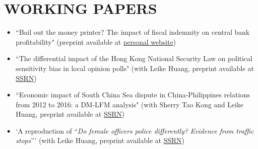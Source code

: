 \documentclass[a4paper,9pt]{extarticle}
\begin{document}
\section*{WORKING PAPERS}
\begin{itemize}
    \item ``Bail out the money printer? The impact of fiscal indemnity on central bank profitability" (preprint available at \href{https://rubuky.com/papers/bailoutcb/}{personal website})
    \item ``The differential impact of the Hong Kong National Security Law on political sensitivity bias in local opinion polls" (with Leike Huang, preprint available at \href{https://dx.doi.org/10.2139/ssrn.4499460}{SSRN})
    \item ``Economic impact of South China Sea dispute in China-Philippines relations from 2012 to 2016: a DM-LFM analysis" (with Sherry Tao Kong and Leike Huang, preprint available at \href{https://dx.doi.org/10.2139/ssrn.4623476}{SSRN})
    \item `A reproduction of ``\textit{Do female officers police differently? Evidence from traffic stops}”' (with Leike Huang, preprint available at \href{https://dx.doi.org/10.2139/ssrn.4632847}{SSRN})
\end{itemize}

\end{document}
